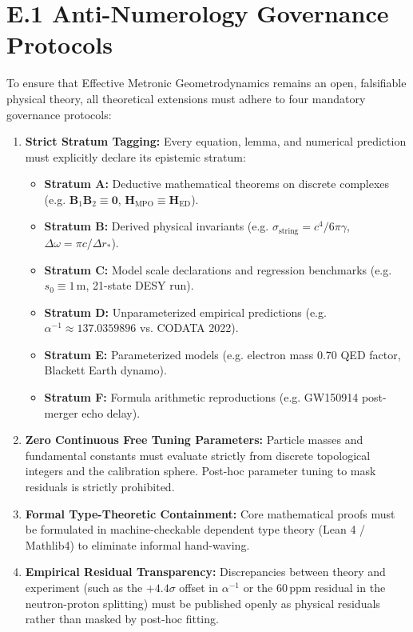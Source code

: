 \documentclass[
    12pt,
    a4paper,
    headings=normal,
    twoside=false,
    open=any,
    parskip=half
]{scrbook}
\begin{document}
\section{E.1 Anti-Numerology Governance Protocols}
\label{sec:appE_governance_protocols}

To ensure that Effective Metronic Geometrodynamics remains an open, falsifiable physical theory, all theoretical extensions must adhere to four mandatory governance protocols:

\begin{enumerate}[label=\textbf{Protocol \arabic*:}, leftmargin=2.2em]
    \item \textbf{Strict Stratum Tagging:} Every equation, lemma, and numerical prediction must explicitly declare its epistemic stratum:
    \begin{itemize}[noitemsep]
        \item \textbf{Stratum A:} Deductive mathematical theorems on discrete complexes (e.g. $\mathbf{B}_1\mathbf{B}_2 \equiv \mathbf{0}$, $\mathbf{H}_{\text{MPO}} \equiv \mathbf{H}_{\text{ED}}$).
        \item \textbf{Stratum B:} Derived physical invariants (e.g. $\sigma_{\text{string}} = c^4 / 6\pi\gamma$, $\Delta\omega = \pi c / \Delta r_*$).
        \item \textbf{Stratum C:} Model scale declarations and regression benchmarks (e.g. $s_0 \equiv 1\,\text{m}$, 21-state DESY run).
        \item \textbf{Stratum D:} Unparameterized empirical predictions (e.g. $\alpha^{-1} \approx 137.0359896$ vs. CODATA 2022).
        \item \textbf{Stratum E:} Parameterized models (e.g. electron mass $0.70$ QED factor, Blackett Earth dynamo).
        \item \textbf{Stratum F:} Formula arithmetic reproductions (e.g. GW150914 post-merger echo delay).
    \end{itemize}
    \item \textbf{Zero Continuous Free Tuning Parameters:} Particle masses and fundamental constants must evaluate strictly from discrete topological integers and the calibration sphere. Post-hoc parameter tuning to mask residuals is strictly prohibited.
    \item \textbf{Formal Type-Theoretic Containment:} Core mathematical proofs must be formulated in machine-checkable dependent type theory (Lean 4 / Mathlib4) to eliminate informal hand-waving.
    \item \textbf{Empirical Residual Transparency:} Discrepancies between theory and experiment (such as the $+4.4\sigma$ offset in $\alpha^{-1}$ or the $60\,\text{ppm}$ residual in the neutron-proton splitting) must be published openly as physical residuals rather than masked by post-hoc fitting.
\end{enumerate}
\end{document}
